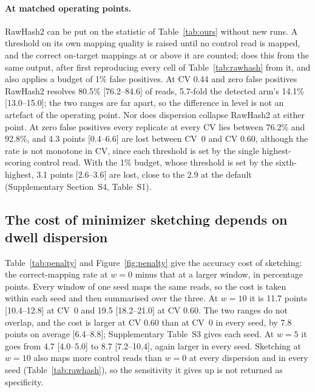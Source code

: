 \documentclass[11pt,a4paper]{article}
\begin{document}
\paragraph{At matched operating points.} RawHash2 can be put on the statistic of
Table~\ref{tab:ours} without new runs. A threshold on its own mapping quality is raised until no
control read is mapped, and the correct on-target mappings at or above it are counted;
 does this from the same output, after first reproducing every cell
of Table~\ref{tab:rawhash} from it, and also applies a budget of 1\% false positives. At CV 0.44 and
zero false positives RawHash2 resolves 80.5\% [76.2--84.6] of reads, 5.7-fold the detected arm's
14.1\% [13.0--15.0]; the two ranges are far apart, so the difference in level is not an artefact of
the operating point. Nor does dispersion collapse RawHash2 at either point. At zero false positives
every replicate at every CV lies between 76.2\% and 92.8\%, and 4.3 points [0.4--6.6] are lost
between CV~0 and CV 0.60, although the rate is not monotone in CV, since each threshold is set by the
single highest-scoring control read. With the 1\% budget, whose threshold is set by the
sixth-highest, 3.1 points [2.6--3.6] are lost, close to the 2.9 at the default (Supplementary
Section~S4, Table~S1).

\subsection{The cost of minimizer sketching depends on dwell dispersion}\label{sec:minimizer}

Table~\ref{tab:penalty} and Figure~\ref{fig:penalty} give the accuracy cost of sketching: the
correct-mapping rate at $w = 0$ minus that at a larger window, in percentage points. Every window of
one seed maps the same reads, so the cost is taken within each seed and then summarised over the
three. At $w = 10$ it is 11.7 points [10.4--12.8] at CV~0 and 19.5 [18.2--21.0] at CV 0.60. The two
ranges do not overlap, and the cost is larger at CV 0.60 than at CV~0 in every seed, by 7.8 points
on average [6.4--8.8]; Supplementary Table~S3 gives each seed. At $w = 5$ it goes from
4.7 [4.0--5.0] to 8.7 [7.2--10.4], again larger in every seed. Sketching at $w = 10$ also maps more control reads than $w = 0$ at every dispersion and
in every seed (Table~\ref{tab:rawhash}), so the sensitivity it gives up is not returned as
specificity.
\end{document}

